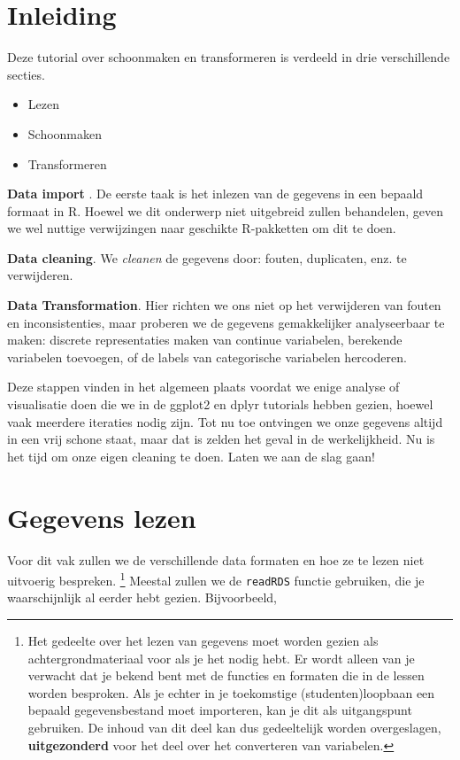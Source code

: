 \documentclass[]{tufte-book}
\providecommand{\tightlist}{%
  \setlength{\itemsep}{0pt}\setlength{\parskip}{0pt}}
\begin{document}
\hypertarget{inleiding}{%
\section{Inleiding}\label{inleiding}}

Deze tutorial over schoonmaken en transformeren is verdeeld in drie verschillende secties.

\begin{itemize}
\tightlist
\item
  Lezen
\item
  Schoonmaken
\item
  Transformeren
\end{itemize}

\textbf{Data import }. De eerste taak is het inlezen van de gegevens in een bepaald formaat in R. Hoewel we dit onderwerp niet uitgebreid zullen behandelen, geven we wel nuttige verwijzingen naar geschikte R-pakketten om dit te doen.

\textbf{Data cleaning}. We \emph{cleanen} de gegevens door: fouten, duplicaten, enz. te verwijderen.

\textbf{Data Transformation}. Hier richten we ons niet op het verwijderen van fouten en inconsistenties, maar proberen we de gegevens gemakkelijker analyseerbaar te maken: discrete representaties maken van continue variabelen, berekende variabelen toevoegen, of de labels van categorische variabelen hercoderen.

Deze stappen vinden in het algemeen plaats voordat we enige analyse of visualisatie doen die we in de ggplot2 en dplyr tutorials hebben gezien, hoewel vaak meerdere iteraties nodig zijn. Tot nu toe ontvingen we onze gegevens altijd in een vrij schone staat, maar dat is zelden het geval in de werkelijkheid. Nu is het tijd om onze eigen cleaning te doen. Laten we aan de slag gaan!

\hypertarget{gegevens-lezen}{%
\section{Gegevens lezen}\label{gegevens-lezen}}

Voor dit vak zullen we de verschillende data formaten en hoe ze te lezen niet uitvoerig bespreken. \footnote{Het gedeelte over het lezen van gegevens moet worden gezien als achtergrondmateriaal voor als je het nodig hebt. Er wordt alleen van je verwacht dat je bekend bent met de functies en formaten die in de lessen worden besproken. Als je echter in je toekomstige (studenten)loopbaan een bepaald gegevensbestand moet importeren, kan je dit als uitgangspunt gebruiken. De inhoud van dit deel kan dus gedeeltelijk worden overgeslagen, \textbf{uitgezonderd} voor het deel over het converteren van variabelen.} Meestal zullen we de \texttt{readRDS} functie gebruiken, die je waarschijnlijk al eerder hebt gezien. Bijvoorbeeld,
\end{document}
